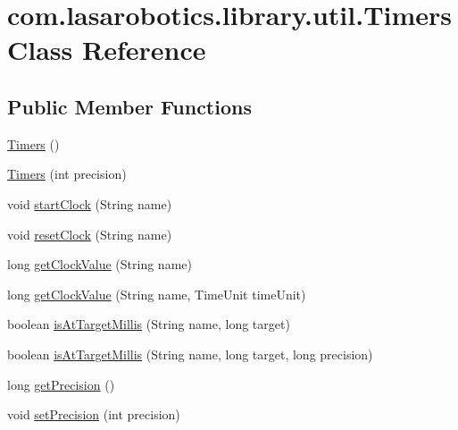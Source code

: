 \hypertarget{classcom_1_1lasarobotics_1_1library_1_1util_1_1_timers}{}\section{com.\+lasarobotics.\+library.\+util.\+Timers Class Reference}
\label{classcom_1_1lasarobotics_1_1library_1_1util_1_1_timers}
\subsection*{Public Member Functions}
\begin{DoxyCompactItemize}
\item 
\hyperlink{classcom_1_1lasarobotics_1_1library_1_1util_1_1_timers_a05e3526671638c8a7989faa021972a5a}{Timers} ()
\item 
\hyperlink{classcom_1_1lasarobotics_1_1library_1_1util_1_1_timers_a85a3d0fdaaf25c38a0f0cf8f8a3270ae}{Timers} (int precision)
\item 
void \hyperlink{classcom_1_1lasarobotics_1_1library_1_1util_1_1_timers_a0baeaa0b504aae6298341e4e4258f41c}{start\+Clock} (String name)
\item 
void \hyperlink{classcom_1_1lasarobotics_1_1library_1_1util_1_1_timers_adfd15587ecf606bc5edd2484be56047a}{reset\+Clock} (String name)
\item 
long \hyperlink{classcom_1_1lasarobotics_1_1library_1_1util_1_1_timers_a7e981eca3d9a4ae24e08a56f375a74cc}{get\+Clock\+Value} (String name)
\item 
long \hyperlink{classcom_1_1lasarobotics_1_1library_1_1util_1_1_timers_afc579ae87fe551fbf34b35bc0ffd0ba6}{get\+Clock\+Value} (String name, Time\+Unit time\+Unit)
\item 
boolean \hyperlink{classcom_1_1lasarobotics_1_1library_1_1util_1_1_timers_a18f1e196191869904f1bf68158929dcf}{is\+At\+Target\+Millis} (String name, long target)
\item 
boolean \hyperlink{classcom_1_1lasarobotics_1_1library_1_1util_1_1_timers_a5cd21a3b007ee957507830fabb952dfd}{is\+At\+Target\+Millis} (String name, long target, long precision)
\item 
long \hyperlink{classcom_1_1lasarobotics_1_1library_1_1util_1_1_timers_a6c7fcedc038f1e8b9f8e0cd6bfdce308}{get\+Precision} ()
\item 
void \hyperlink{classcom_1_1lasarobotics_1_1library_1_1util_1_1_timers_a9bc557ec5fbf399594df81d132e3b46f}{set\+Precision} (int precision)
\end{DoxyCompactItemize}


